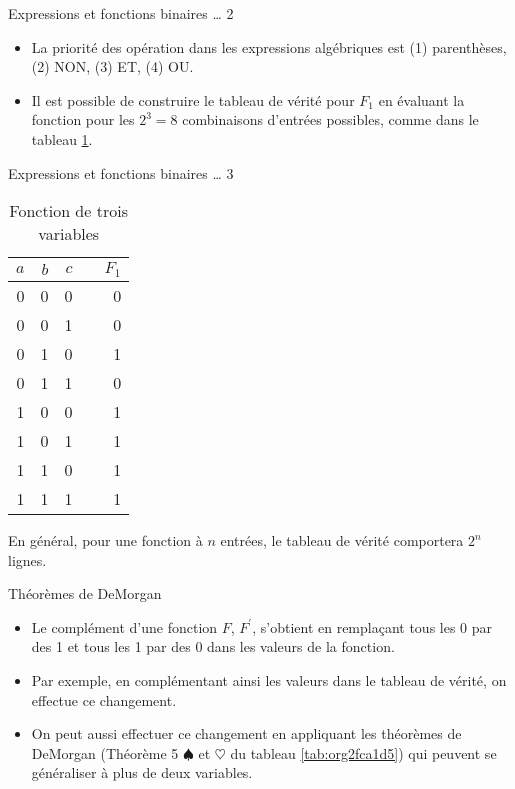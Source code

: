 \documentclass[presentation]{beamer}
\begin{document}
\begin{frame}[label={sec:org3875063}]{Expressions et fonctions binaires \ldots{} 2}
\begin{itemize}
\item La priorité des opération dans les expressions algébriques est (1) parenthèses, (2) NON, (3) ET, (4) OU.

\item Il est possible de construire le tableau de vérité pour \(F_1\) en évaluant la fonction pour les \(2^3 = 8\) combinaisons d'entrées possibles, comme dans le tableau \ref{tab:org645b0c0}.
\end{itemize}
\end{frame}

\begin{frame}[label={sec:org07ee712}]{Expressions et fonctions binaires \ldots{} 3}
\begin{table}[htbp]
\caption{\label{tab:org645b0c0}Fonction de trois variables}
\centering
\begin{tabular}{rrrlr}
\(a\) & \(b\) & \(c\) &  & \(F_1\)\\[0pt]
\hline
0 & 0 & 0 &  & 0\\[0pt]
0 & 0 & 1 &  & 0\\[0pt]
0 & 1 & 0 &  & 1\\[0pt]
0 & 1 & 1 &  & 0\\[0pt]
1 & 0 & 0 &  & 1\\[0pt]
1 & 0 & 1 &  & 1\\[0pt]
1 & 1 & 0 &  & 1\\[0pt]
1 & 1 & 1 &  & 1\\[0pt]
\end{tabular}
\end{table}

En général, pour une fonction à \(n\) entrées, le tableau de vérité
comportera \(2^n\) lignes.
\end{frame}

\begin{frame}[label={sec:org8ed7153}]{Théorèmes de DeMorgan}
\begin{itemize}
\item Le complément d'une fonction \(F\), \(F^\prime\), s'obtient en remplaçant tous les 0 par des 1 et tous les 1 par des 0 dans les valeurs de la fonction.

\item Par exemple, en complémentant ainsi les valeurs dans le tableau de vérité, on effectue ce changement.

\item On peut aussi effectuer ce changement en appliquant les théorèmes de DeMorgan (Théorème 5 \(\spadesuit\) et \(\heartsuit\) du tableau \ref{tab:org2fca1d5}) qui peuvent se généraliser à plus de deux variables.
\end{itemize}
\end{frame}
\end{document}
